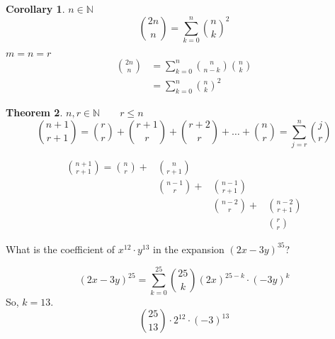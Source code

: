 \documentclass[letterpaper, 12pt]{article}
\newtheorem{theorem}{Theorem}[section]
\newtheorem{corollary}[theorem]{Corollary}
\newenvironment{proof}[1][Proof]{\begin{trivlist}
\item[\hskip \labelsep {\bfseries #1}]}{\end{trivlist}}
\newenvironment{example}[1][Example]{\begin{trivlist}
\item[\hskip \labelsep {\bfseries #1}]}{\end{trivlist}}
\newcommand{\N}{\mathbb{N}}
\newcommand{\0}{\emptyset}
\begin{document}
    \begin{corollary}
        $n \in \N$
        \[\binom{2n}{n} = \sum_{k=0}^{n} \binom{n}{k}^2\]
    \end{corollary}
    \begin{proof}
        $m=n=r$
        \[\begin{split}
            \binom{2n}{n} &= \sum_{k=0}^{n} \binom{n}{n-k} \binom{n}{k} \\
            &= \sum_{k=0}^{n} \binom{n}{k}^2
        \end{split}\]
    \end{proof}
    \begin{theorem}
        $n, r \in \N \qquad r \le n$
        \[\binom{n+1}{r+1} = \binom{r}{r} + \binom{r+1}{r} + \binom{r+2}{r} + \dots 
        + \binom{n}{r} = \sum_{j=r}^{n} \binom{j}{r}\]
    \end{theorem}
    \begin{proof}
        \[\begin{alignedat}{3}
            \binom{n+1}{r+1} = \binom{n}{r} + &\binom{n}{r+1} & & \\
            &\binom{n-1}{r} + &\binom{n-1}{r+1} & \\
            & &\binom{n-2}{r} + &\binom{n-2}{r+1} \\
            & & &\binom{r}{r}
        \end{alignedat}\]
    \end{proof}
    \begin{example}
        What is the coefficient of $x^{12} \cdot y^{13}$ in the expansion $(2x-3y)^{35}$?
    \end{example}
    \begin{proof}
        \[(2x-3y)^{25} = \sum_{k=0}^{25} \binom{25}{k}(2x)^{25-k} \cdot (-3y)^k\]
        So, $k = 13$.
        \[\binom{25}{13} \cdot 2^{12} \cdot (-3)^{13}\]
    \end{proof}
\end{document}
